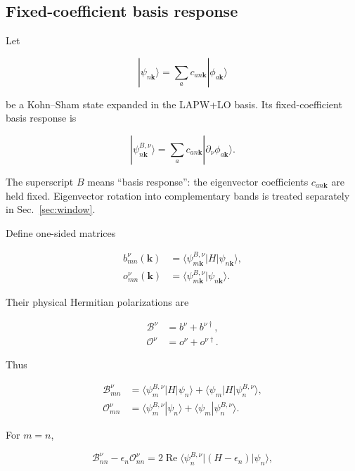 \documentclass[11pt]{article}
\numberwithin{equation}{section}
\newcommand{\Ree}{\operatorname{Re}}
\newcommand{\kb}{\mathbf k}
\begin{document}
\subsection{Fixed-coefficient basis response}

Let

\begin{equation}
 |\psi_{n\kb}\rangle=\sum_a c_{an\kb}|\phi_{a\kb}\rangle
\end{equation}

be a Kohn--Sham state expanded in the LAPW+LO basis.  Its fixed-coefficient
basis response is

\begin{equation}
 |\psi^{B,\nu}_{n\kb}\rangle
 =\sum_a c_{an\kb}|\partial_\nu\phi_{a\kb}\rangle.
 \label{eq:basisresponse}
\end{equation}

The superscript $B$ means ``basis response'': the eigenvector coefficients
$c_{an\kb}$ are held fixed.  Eigenvector rotation into complementary bands is
treated separately in Sec.~\ref{sec:window}.

Define one-sided matrices

\begin{align}
 b^\nu_{mn}(\kb)&=
 \langle\psi^{B,\nu}_{m\kb}|H|\psi_{n\kb}\rangle,\\
 o^\nu_{mn}(\kb)&=
 \langle\psi^{B,\nu}_{m\kb}|\psi_{n\kb}\rangle.
 \label{eq:one-sided}
\end{align}

Their physical Hermitian polarizations are

\begin{align}
 \mathcal B^\nu&=b^\nu+b^{\nu\dagger},\\
 \mathcal O^\nu&=o^\nu+o^{\nu\dagger}.
 \label{eq:BOherm}
\end{align}

Thus

\begin{align}
 \mathcal B^\nu_{mn}&=
 \langle\psi^{B,\nu}_{m}|H|\psi_n\rangle
 +\langle\psi_m|H|\psi^{B,\nu}_n\rangle,\\
 \mathcal O^\nu_{mn}&=
 \langle\psi^{B,\nu}_{m}|\psi_n\rangle
 +\langle\psi_m|\psi^{B,\nu}_n\rangle.
\end{align}

For $m=n$,

\begin{equation}
 \mathcal B^\nu_{nn}-\epsilon_n\mathcal O^\nu_{nn}
 =2\Ree\langle\psi^{B,\nu}_n|(H-\epsilon_n)|\psi_n\rangle,
 \label{eq:Blaha20general}
\end{equation}
\end{document}
